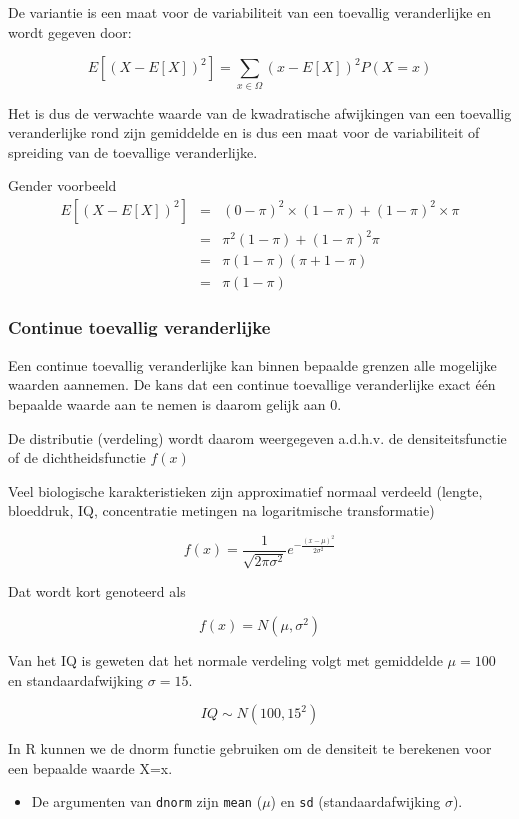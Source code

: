 \documentclass[
  12pt,dutch,coursenotes]{book}
\providecommand{\tightlist}{%
  \setlength{\itemsep}{0pt}\setlength{\parskip}{0pt}}
\theoremstyle{definition}
\theoremstyle{definition}
\theoremstyle{definition}
\theoremstyle{remark}
\begin{document}
De variantie is een maat voor de variabiliteit van een toevallig veranderlijke en wordt gegeven door:

\[E[(X-E[X])^2]=\sum\limits_{x\in\Omega} (x-E[X])^2 P(X=x)\]

Het is dus de verwachte waarde van de kwadratische afwijkingen van een toevallig veranderlijke rond zijn gemiddelde en is dus een maat voor de variabiliteit of spreiding van de toevallige veranderlijke.

Gender voorbeeld
\begin{eqnarray}
    E[(X-E[X])^2]&=&(0-\pi)^2\times (1-\pi)+(1-\pi)^2 \times \pi\\
    &=& \pi^2 (1-\pi) + (1-\pi)^2 \pi\\
    &=&\pi (1-\pi)(\pi+1-\pi)\\
    &=&\pi(1-\pi)
    \end{eqnarray}

\hypertarget{continue-toevallig-veranderlijke}{%
\subsubsection{Continue toevallig veranderlijke}\label{continue-toevallig-veranderlijke}}

Een continue toevallig veranderlijke kan binnen bepaalde grenzen alle mogelijke waarden aannemen. De kans dat een continue toevallige veranderlijke exact één bepaalde waarde aan te nemen is daarom gelijk aan 0.

De distributie (verdeling) wordt daarom weergegeven a.d.h.v. de densiteitsfunctie of de dichtheidsfunctie \(f(x)\)

Veel biologische karakteristieken zijn approximatief normaal verdeeld (lengte, bloeddruk, IQ, concentratie metingen na logaritmische transformatie)

\[f(x) = \frac{1}{\sqrt{2\pi\sigma^2}} e^{-\frac{(x-\mu)^2}{2\sigma^2}}\]

Dat wordt kort genoteerd als

\[f(x) = N(\mu,\sigma^2)\]

Van het IQ is geweten dat het normale verdeling volgt met gemiddelde \(\mu=100\) en standaardafwijking \(\sigma=15\).

\[IQ \sim N(100,15^2)\]

In R kunnen we de dnorm functie gebruiken om de densiteit te berekenen voor een bepaalde waarde X=x.

\begin{itemize}
\tightlist
\item
  De argumenten van \texttt{dnorm} zijn \texttt{mean} (\(\mu\)) en \texttt{sd} (standaardafwijking \(\sigma\)).
\end{itemize}
\end{document}
